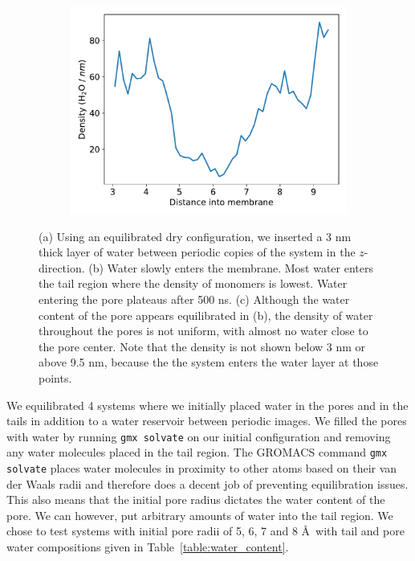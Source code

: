 \documentclass{article}
\begin{document}
\begin{figure}[!htb]
\begin{subfigure}{0.37\textwidth}
  \caption{}\label{fig:equilibrated_water_penetration}
  \end{subfigure}  
  \begin{subfigure}{0.37\textwidth}
  \includegraphics[width=\linewidth]{penetration_density.pdf}
  \caption{}\label{fig:penetration_density}
  \end{subfigure}  
  \caption{(a) Using an equilibrated dry configuration, we inserted a 3 nm thick layer 
  of water between periodic copies of the system in the $z$-direction. (b) Water slowly
  enters the membrane. Most water enters the tail region where the density of monomers
  is lowest. Water entering the pore plateaus after 500 ns. (c) Although the water
  content of the pore appears equilibrated in (b), the density of water throughout
  the pores is not uniform, with almost no water close to the pore center. Note that
  the density is not shown below 3 nm or above 9.5 nm, because the the system
  enters the water layer at those points.
  }\label{fig:gap_solvation}
  \end{figure}

  We equilibrated 4 systems where we initially placed water in the pores and in
  the tails in addition to a water reservoir between periodic images. We filled
  the pores with water by running \texttt{gmx solvate} on our initial
  configuration and removing any water molecules placed in the tail region. The
  GROMACS command \texttt{gmx solvate} places water molecules in proximity to
  other atoms based on their van der Waals radii and therefore does
  a decent job of preventing equilibration issues. This also means that the
  initial pore radius dictates the water content of the pore. We can however, put
  arbitrary amounts of water into the tail region. We chose to test systems with
  initial pore radii of 5, 6, 7 and 8 \AA~with tail and pore water compositions
  given in Table~\ref{table:water_content}.
\end{document}
